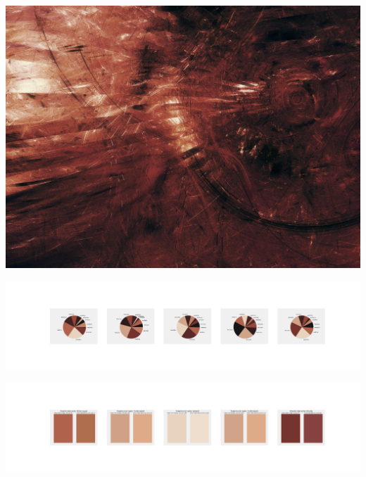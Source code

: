 \documentclass[11pt]{article}
\begin{document}
\begin{landscape}
    \begin{center}
    \includegraphics[width=\textwidth]{./nbimg/file (147).jpg}
    \end{center}

    \begin{center}
    \includegraphics[width=250mm]{./nbimg/pie-53.jpg}
    \end{center}

    \begin{center}
    \includegraphics[width=250mm]{./nbimg/peak-53.jpg}
    \end{center}
    


\end{landscape}
\end{document}
